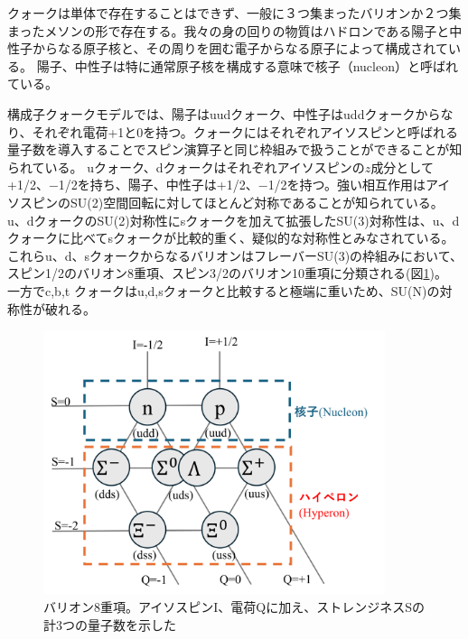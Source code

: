 \documentclass[a4paper,11pt,uplatex]{jsbook}
\begin{document}
クォークは単体で存在することはできず、一般に３つ集まったバリオンか２つ集まったメソンの形で存在する。我々の身の回りの物質はハドロンである陽子と中性子からなる原子核と、その周りを囲む電子からなる原子によって構成されている。
陽子、中性子は特に通常原子核を構成する意味で核子（nucleon）と呼ばれている。

構成子クォークモデルでは、陽子はuudクォーク、中性子はuddクォークからなり、それぞれ電荷+1と0を持つ。クォークにはそれぞれアイソスピンと呼ばれる量子数を導入することでスピン演算子と同じ枠組みで扱うことができることが知られている。
uクォーク、dクォークはそれぞれアイソスピンの$z$成分として+1/2、$-$1/2を持ち、陽子、中性子は+1/2、$-$1/2を持つ。強い相互作用はアイソスピンのSU(2)空間回転に対してほとんど対称であることが知られている。
u、dクォークのSU(2)対称性にsクォークを加えて拡張したSU(3)対称性は、u、dクォークに比べてsクォークが比較的重く、疑似的な対称性とみなされている。
これらu、d、sクォークからなるバリオンはフレーバーSU(3)の枠組みにおいて、スピン1/2のバリオン8重項、スピン3/2のバリオン10重項に分類される(図\ref{fig:baryon})。
一方でc,b,t クォークはu,d,sクォークと比較すると極端に重いため、SU(N)の対称性が破れる。
\begin{figure}[h]
  \centering
  \includegraphics[width=10cm]{image/1_baryon.png}
  \caption[バリオン8重項]{バリオン8重項。アイソスピンI、電荷Qに加え、ストレンジネスSの計3つの量子数を示した}
  \label{fig:baryon}
\end{figure}
\end{document}
